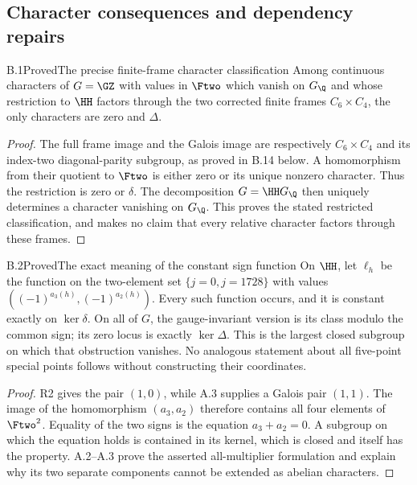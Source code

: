 \subsection{Character consequences and dependency repairs}


\begin{statement}{B.1}{Proved}{The precise finite-frame character classification}
Among continuous characters of $G=\GZ$ with values in $\Ftwo$
which vanish on $G_{\Q}$ and whose restriction to $\HH$ factors
through the two corrected finite frames $C_6\times C_4$, the
only characters are zero and $\Delta$.
\end{statement}
\begin{proof}
The full frame image and the Galois image are respectively
$C_6\times C_4$ and its index-two diagonal-parity subgroup,
as proved in B.14 below. A homomorphism from their quotient
to $\Ftwo$ is either zero or its unique nonzero character.
Thus the restriction is zero or $\delta$. The decomposition
$G=\HH G_{\Q}$ then uniquely determines a character
vanishing on $G_{\Q}$. This proves the stated restricted
classification, and makes no claim that every relative
character factors through these frames.
\end{proof}

\begin{statement}{B.2}{Proved}{The exact meaning of the constant sign function}
On $\HH$, let $\ell_h$ be the function on the two-element set
$\{j=0,j=1728\}$ with values
$((-1)^{a_3(h)},(-1)^{a_2(h)})$. Every such function occurs,
and it is constant exactly on $\ker\delta$.
On all of $G$, the gauge-invariant version is its class modulo
the common sign; its zero locus is exactly $\ker\Delta$.
This is the largest closed subgroup on which that obstruction
vanishes. No analogous statement about all five-point special
points follows without constructing their coordinates.
\end{statement}
\begin{proof}
R2 gives the pair $(1,0)$, while A.3 supplies a Galois pair
$(1,1)$. The image of the homomorphism $(a_3,a_2)$ therefore
contains all four elements of $\Ftwo^2$. Equality of the two
signs is the equation $a_3+a_2=0$. A subgroup on which the
equation holds is contained in its kernel, which is closed
and itself has the property. A.2--A.3 prove the asserted
all-multiplier formulation and explain why its two separate
components cannot be extended as abelian characters.
\end{proof}

